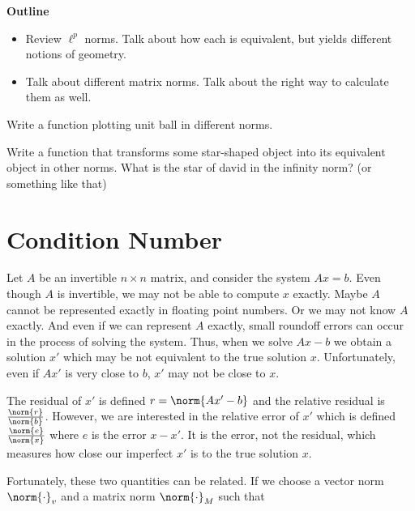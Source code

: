 

{\bf Outline}
\begin{itemize}
\item Review $\ell^p$ norms. Talk about how each is equivalent, but yields different notions of geometry.
\item Talk about different matrix norms. Talk about the right way to calculate them as well.
\end{itemize}
\begin{problem}
Write a function plotting unit ball in different norms.
\end{problem}



\begin{problem}
Write a function that transforms some star-shaped object into its equivalent object in other norms. What is the star of david in the infinity norm? (or something like that)
\end{problem}

\section*{Condition Number}

Let $A$ be an invertible $n \times n $ matrix, and consider the system $Ax = b$. Even though $A$ is invertible, we may not be able to compute $x$ exactly.  Maybe $A$ cannot be represented exactly in floating point numbers. Or we may not know $A$ exactly. And even if we can represent $A$ exactly, small roundoff errors can occur in the process of solving the system. Thus, when we solve $Ax-b$ we obtain a solution $x'$ which may be not equivalent to the true solution $x$. Unfortunately, even if $Ax'$ is very close to $b$, $x'$ may not be close to $x$. 

The residual of $x'$ is defined $r = \norm{Ax'-b}$ and the relative residual is $\frac{\norm{r}}{\norm{b}}$. However, we are interested in the relative error of $x'$ which is defined $\frac{\norm{e}}{\norm{x}}$ where $e$ is the error $x-x'$. It is the error, not the residual, which measures how close our imperfect $x'$ is to the true solution $x$. 

Fortunately, these two quantities can be related. If we choose a vector norm $\norm{\cdot} _v$ and a matrix norm $\norm{\cdot} _M$ such that 

